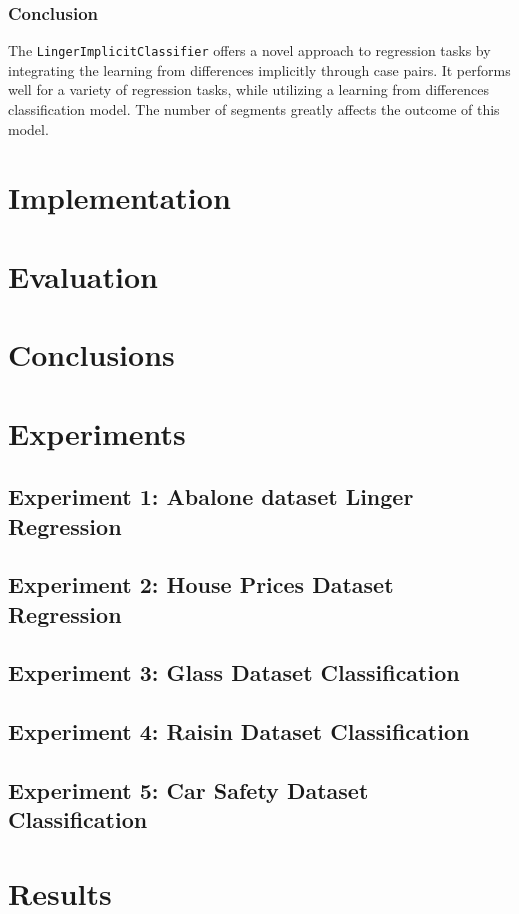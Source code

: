 \documentclass[a4paper, 12pt]{report}
\begin{document}
\subsection{Conclusion}
The \texttt{LingerImplicitClassifier} offers a novel approach to regression tasks by integrating the learning from differences implicitly through case pairs. 
It performs well for a variety of regression tasks, while utilizing a learning from differences classification model. The number of segments greatly affects the outcome of this model.


\chapter{Implementation}
\label{ch:Implementation}

\chapter{Evaluation}
\label{ch:Evaluation}

\chapter{Conclusions}
\label{ch:Conclusions}

\chapter{Experiments}
\label{ch:Experimnents}

\section{Experiment 1: Abalone dataset Linger Regression}

\section{Experiment 2: House Prices Dataset Regression}

\section{Experiment 3: Glass Dataset Classification}

\section{Experiment 4: Raisin Dataset Classification}

\section{Experiment 5: Car Safety Dataset Classification}

\chapter{Results}
\label{ch:Results}


\end{document}

